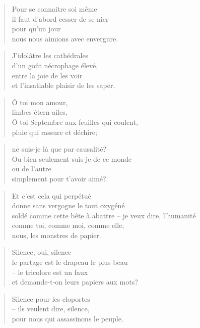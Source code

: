   \begin{verse}
    Pour se connaitre soi même\\
    il faut d’abord cesser de se nier\\
    pour qu’un jour\\
    nous nous aimions avec envergure.
  \end{verse}
  \begin{verse}
    J’idolâtre les cathédrales\\
    d’un goût nécrophage élevé,\\
    entre la joie de les voir\\
    et l’insatiable plaisir de les saper.
  \end{verse}
  \begin{verse}
    Ô toi mon amour,\\
    limbes étern-ailes,\\
    Ô toi Septembre aux feuilles qui coulent,\\
    pluie qui rassure et déchire;
  \end{verse}
  \begin{verse}
    ne suis-je là que par causalité?\\
    Ou bien seulement suis-je de ce monde\\
    ou de l’autre\\
    simplement pour t’avoir aimé?
  \end{verse}
  \begin{verse}
    Et c’est cela qui perpétué\\
    donne sans vergogne le tout oxygéné\\
    soldé comme cette bête à abattre -- je veux dire, l’humanité\\
    comme toi, comme moi, comme elle,\\
    nous, les monstres de papier.
  \end{verse}
  \begin{verse}
    Silence, oui, silence\\
    le partage est le drapeau le plus beau\\
    -- le tricolore est un faux\\
    et demande-t-on leurs papiers aux mots?
  \end{verse}
  \begin{verse}
    Silence pour les cloportes\\
    -- ils veulent dire, silence,\\
    pour nous qui assassinons le peuple.
  \end{verse}

